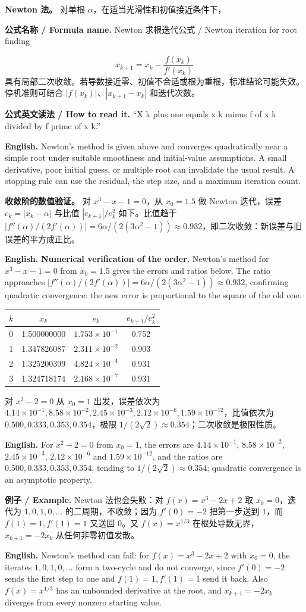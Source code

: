 \documentclass[UTF8,11pt,a4paper]{ctexart}
\newcommand{\EN}[1]{\par\noindent\textbf{English.} #1\par}
\newcommand{\READ}[1]{\par\noindent\textbf{公式英文读法 / How to read it.} #1\par}
\newcommand{\FORMULA}[2]{\par\noindent\textbf{公式名称 / Formula name.} #1 / #2\par}
\newcommand{\EX}[2]{\par\noindent\textbf{例子 / Example.} #1\par\EN{#2}}
\begin{document}
\noindent\textbf{Newton 法。} 对单根 $\alpha$，在适当光滑性和初值接近条件下，
\FORMULA{Newton 求根迭代公式}{Newton iteration for root finding}
\[
x_{k+1}=x_k-\frac{f(x_k)}{f'(x_k)}
\]
具有局部二次收敛。若导数接近零、初值不合适或根为重根，标准结论可能失效。停机准则可结合 $|f(x_k)|$、$|x_{k+1}-x_k|$ 和迭代次数。
\READ{“X k plus one equals x k minus f of x k divided by f prime of x k.”}
\EN{Newton's method is given above and converges quadratically near a simple root under suitable smoothness and initial-value assumptions. A small derivative, poor initial guess, or multiple root can invalidate the usual result. A stopping rule can use the residual, the step size, and a maximum iteration count.}

\noindent\textbf{收敛阶的数值验证。} 对 $x^3-x-1=0$，从 $x_0=1.5$ 做 Newton 迭代，误差 $e_k=|x_k-\alpha|$ 与比值 $|e_{k+1}|/e_k^2$ 如下。比值趋于 $|f''(\alpha)/(2f'(\alpha))|=6\alpha/(2(3\alpha^2-1))\approx0.932$，即二次收敛：新误差与旧误差的平方成正比。
\EN{\textbf{Numerical verification of the order.} Newton's method for $x^3-x-1=0$ from $x_0=1.5$ gives the errors and ratios below. The ratio approaches $|f''(\alpha)/(2f'(\alpha))|=6\alpha/(2(3\alpha^2-1))\approx0.932$, confirming quadratic convergence: the new error is proportional to the square of the old one.}
\begin{center}\footnotesize
\begin{tabular}{c c c c}
\hline
$k$ & $x_k$ & $e_k$ & $e_{k+1}/e_k^2$\\
\hline
0 & 1.500000000 & $1.753\times10^{-1}$ & 0.752\\
1 & 1.347826087 & $2.311\times10^{-2}$ & 0.903\\
2 & 1.325200399 & $4.824\times10^{-4}$ & 0.931\\
3 & 1.324718174 & $2.168\times10^{-7}$ & 0.931\\
\hline
\end{tabular}
\end{center}
\noindent 对 $x^2-2=0$ 从 $x_0=1$ 出发，误差依次为 $4.14\times10^{-1},8.58\times10^{-2},2.45\times10^{-3},2.12\times10^{-6},1.59\times10^{-12}$，比值依次为 $0.500,0.333,0.353,0.354$，极限 $1/(2\sqrt2)\approx0.354$；二次收敛是极限性质。
\EN{For $x^2-2=0$ from $x_0=1$, the errors are $4.14\times10^{-1}$, $8.58\times10^{-2}$, $2.45\times10^{-3}$, $2.12\times10^{-6}$ and $1.59\times10^{-12}$, and the ratios are $0.500,0.333,0.353,0.354$, tending to $1/(2\sqrt2)\approx0.354$; quadratic convergence is an asymptotic property.}
\EX{Newton 法也会失败：对 $f(x)=x^3-2x+2$ 取 $x_0=0$，迭代为 $1,0,1,0,\ldots$ 的二周期，不收敛；因为 $f'(0)=-2$ 把第一步送到 $1$，而 $f(1)=1,f'(1)=1$ 又送回 $0$。又 $f(x)=x^{1/3}$ 在根处导数无界，$x_{k+1}=-2x_k$ 从任何非零初值发散。}{Newton's method can fail: for $f(x)=x^3-2x+2$ with $x_0=0$, the iterates $1,0,1,0,\ldots$ form a two-cycle and do not converge, since $f'(0)=-2$ sends the first step to one and $f(1)=1,f'(1)=1$ send it back. Also $f(x)=x^{1/3}$ has an unbounded derivative at the root, and $x_{k+1}=-2x_k$ diverges from every nonzero starting value.}
\end{document}
